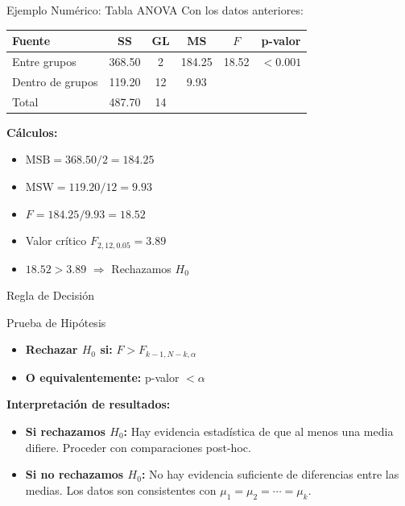\documentclass[10pt,aspectratio=169]{beamer}
\begin{document}
\begin{frame}{Ejemplo Numérico: Tabla ANOVA}
Con los datos anteriores:

\vspace{0.3cm}

\begin{center}
\begin{tabular}{lccccc}
\toprule
Fuente & SS & GL & MS & $F$ & p-valor \\
\midrule
Entre grupos & 368.50 & 2 & 184.25 & 18.52 & $<0.001$ \\
Dentro de grupos & 119.20 & 12 & 9.93 & & \\
Total & 487.70 & 14 & & & \\
\bottomrule
\end{tabular}
\end{center}

\vspace{0.3cm}

\textbf{Cálculos:}
\begin{itemize}
    \item $\text{MSB} = 368.50 / 2 = 184.25$
    \item $\text{MSW} = 119.20 / 12 = 9.93$
    \item $F = 184.25 / 9.93 = 18.52$
    \item Valor crítico $F_{2,12,0.05} = 3.89$
    \item $18.52 > 3.89$ $\Rightarrow$ \alert{Rechazamos $H_0$}
\end{itemize}
\end{frame}

\begin{frame}{Regla de Decisión}
\begin{block}{Prueba de Hipótesis}
\begin{itemize}
    \item \textbf{Rechazar $H_0$ si:} $F > F_{k-1, N-k, \alpha}$
    \item \textbf{O equivalentemente:} p-valor $< \alpha$
\end{itemize}
\end{block}

\vspace{0.5cm}

\textbf{Interpretación de resultados:}

\begin{itemize}
    \item \textbf{Si rechazamos $H_0$:} Hay evidencia estadística de que al menos una media difiere. Proceder con comparaciones post-hoc.
    
    \item \textbf{Si no rechazamos $H_0$:} No hay evidencia suficiente de diferencias entre las medias. Los datos son consistentes con $\mu_1 = \mu_2 = \cdots = \mu_k$.
\end{itemize}
\end{frame}
\end{document}
